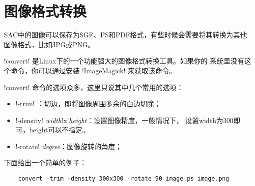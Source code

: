 \section{图像格式转换}
\label{sec:format-conversion}

SAC中的图像可以保存为SGF、PS和PDF格式，有些时候会需要将其转换为其他
图像格式，比如JPG或PNG。

!convert! 是Linux下的一个功能强大的图像格式转换工具。如果你的
系统里没有这个命令，你可以通过安装 !ImageMagick! 来获取该命令。

!convert! 命令的选项众多，这里只说其中几个常用的选项：
\begin{itemize}
\item !-trim! ：切边，即将图像周围多余的白边切除；
\item !-density!  \textit{width}!x!\textit{height}：设置图像精度，一般情况下，
    设置width为300即可，height可以不指定。
\item !-rotate!  \textit{degree}：图像旋转的角度；
\end{itemize}

下面给出一个简单的例子：
\begin{verbatim}
    convert -trim -density 300x300 -rotate 90 image.ps image.png
\end{verbatim}
